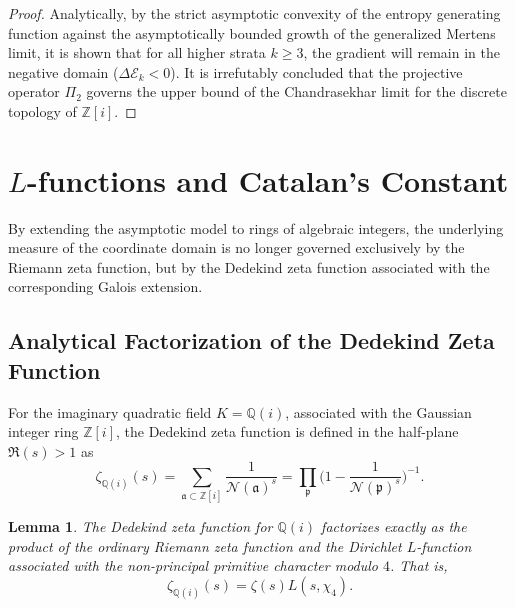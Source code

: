 \documentclass{article}
\numberwithin{equation}{section}
\theoremstyle{plain}
\newtheorem{lemma}[theorem]{Lemma}
\theoremstyle{definition}
\begin{document}
\begin{proof}
Analytically, by the strict asymptotic convexity of the entropy generating function against the asymptotically bounded growth of the generalized Mertens limit, it is shown that for all higher strata $k \ge 3$, the gradient will remain in the negative domain ($\Delta \mathcal{E}_k < 0$). It is irrefutably concluded that the projective operator $\Pi_2$ governs the upper bound of the Chandrasekhar limit for the discrete topology of $\mathbb{Z}[i]$.
\end{proof}

\section{$L$-functions and Catalan's Constant}
\label{sec:funciones_L}

By extending the asymptotic model to rings of algebraic integers, the underlying measure of the coordinate domain is no longer governed exclusively by the Riemann zeta function, but by the Dedekind zeta function associated with the corresponding Galois extension.

\subsection{Analytical Factorization of the Dedekind Zeta Function}

For the imaginary quadratic field $K = \mathbb{Q}(i)$, associated with the Gaussian integer ring $\mathbb{Z}[i]$, the Dedekind zeta function is defined in the half-plane $\Re(s) > 1$ as
\begin{equation}
    \zeta_{\mathbb{Q}(i)}(s) = \sum_{\mathfrak{a} \subset \mathbb{Z}[i]} \frac{1}{\mathcal{N}(\mathfrak{a})^s} = \prod_{\mathfrak{p}} \bigg( 1 - \frac{1}{\mathcal{N}(\mathfrak{p})^s} \bigg)^{-1}.
\end{equation}

\begin{lemma}
The Dedekind zeta function for $\mathbb{Q}(i)$ factorizes exactly as the product of the ordinary Riemann zeta function and the Dirichlet $L$-function associated with the non-principal primitive character modulo $4$. That is,
\begin{equation}
    \zeta_{\mathbb{Q}(i)}(s) = \zeta(s) L(s, \chi_4).
\end{equation}
\end{lemma}
\end{document}

